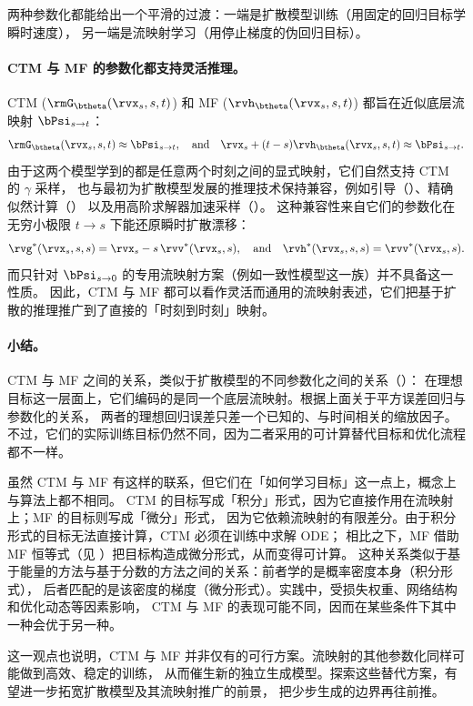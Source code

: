 两种参数化都能给出一个平滑的过渡：一端是扩散模型训练（用固定的回归目标学瞬时速度），
另一端是流映射学习（用停止梯度的伪回归目标）。\paragraph{CTM 与 MF 的参数化都支持灵活推理。}
CTM ($\rmG_\btheta(\rvx_s,s,t)$) 和 MF ($\rvh_\btheta(\rvx_s,s,t)$) 都旨在近似底层流映射 $\bPsi_{s\to t}$：
\[
\rmG_\btheta(\rvx_s,s,t)\approx\bPsi_{s\to t},\quad  \text{and}
\quad
\rvx_s+(t-s)\rvh_\btheta(\rvx_s,s,t)\approx\bPsi_{s\to t}.
\]
由于这两个模型学到的都是任意两个时刻之间的显式映射，它们自然支持 CTM 的 $\gamma$ 采样，
也与最初为扩散模型发展的推理技术保持兼容，例如引导（）、精确似然计算（）
以及用高阶求解器加速采样（）。
这种兼容性来自它们的参数化在无穷小极限 $t\to s$ 下能还原瞬时扩散漂移：
\[
\rvg^*(\rvx_s,s,s)=\rvx_s-s\,\rvv^*(\rvx_s,s),
\quad  \text{and}
\quad
\rvh^*(\rvx_s,s,s)=\rvv^*(\rvx_s,s).
\]
而只针对 $\bPsi_{s\to0}$ 的专用流映射方案（例如一致性模型这一族）并不具备这一性质。
因此，CTM 与 MF 都可以看作灵活而通用的流映射表述，它们把基于扩散的推理推广到了直接的「时刻到时刻」映射。


\paragraph{小结。}


CTM 与 MF 之间的关系，类似于扩散模型的不同参数化之间的关系（）：
在理想目标这一层面上，它们编码的是同一个底层流映射。根据上面关于平方误差回归与参数化的关系，
两者的理想回归误差只差一个已知的、与时间相关的缩放因子。不过，它们的实际训练目标仍然不同，因为二者采用的可计算替代目标和优化流程都不一样。

虽然 CTM 与 MF 有这样的联系，但它们在「如何学习目标」这一点上，概念上与算法上都不相同。
CTM 的目标写成「积分」形式，因为它直接作用在流映射上；MF 的目标则写成「微分」形式，
因为它依赖流映射的有限差分。由于积分形式的目标无法直接计算，CTM 必须在训练中求解 ODE；
相比之下，MF 借助 MF 恒等式（见 ）把目标构造成微分形式，从而变得可计算。
这种关系类似于基于能量的方法与基于分数的方法之间的关系：前者学的是概率密度本身（积分形式），
后者匹配的是该密度的梯度（微分形式）。实践中，受损失权重、网络结构和优化动态等因素影响，
CTM 与 MF 的表现可能不同，因而在某些条件下其中一种会优于另一种。

这一观点也说明，CTM 与 MF 并非仅有的可行方案。流映射的其他参数化同样可能做到高效、稳定的训练，
从而催生新的独立生成模型。探索这些替代方案，有望进一步拓宽扩散模型及其流映射推广的前景，
把少步生成的边界再往前推。


